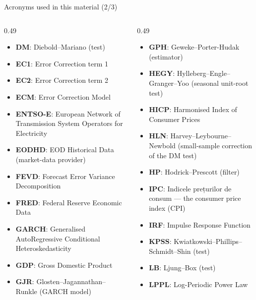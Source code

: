\begin{frame}{Acronyms used in this material (2/3)}
\begin{columns}[T]
\begin{column}{0.49\textwidth}
\begin{itemize}\setlength{\itemsep}{0pt}
    \item \textbf{DM}: Diebold–Mariano (test)
    \item \textbf{EC1}: Error Correction term 1
    \item \textbf{EC2}: Error Correction term 2
    \item \textbf{ECM}: Error Correction Model
    \item \textbf{ENTSO-E}: European Network of Transmission System Operators for Electricity
    \item \textbf{EODHD}: EOD Historical Data (market-data provider)
    \item \textbf{FEVD}: Forecast Error Variance Decomposition
    \item \textbf{FRED}: Federal Reserve Economic Data
    \item \textbf{GARCH}: Generalised AutoRegressive Conditional Heteroskedasticity
    \item \textbf{GDP}: Gross Domestic Product
    \item \textbf{GJR}: Glosten–Jagannathan–Runkle (GARCH model)
\end{itemize}
\end{column}
\begin{column}{0.49\textwidth}
\begin{itemize}\setlength{\itemsep}{0pt}
    \item \textbf{GPH}: Geweke–Porter-Hudak (estimator)
    \item \textbf{HEGY}: Hylleberg–Engle–Granger–Yoo (seasonal unit-root test)
    \item \textbf{HICP}: Harmonised Index of Consumer Prices
    \item \textbf{HLN}: Harvey–Leybourne–Newbold (small-sample correction of the DM test)
    \item \textbf{HP}: Hodrick–Prescott (filter)
    \item \textbf{IPC}: Indicele prețurilor de consum — the consumer price index (CPI)
    \item \textbf{IRF}: Impulse Response Function
    \item \textbf{KPSS}: Kwiatkowski–Phillips–Schmidt–Shin (test)
    \item \textbf{LB}: Ljung–Box (test)
    \item \textbf{LPPL}: Log-Periodic Power Law
\end{itemize}
\end{column}
\end{columns}
\end{frame}
